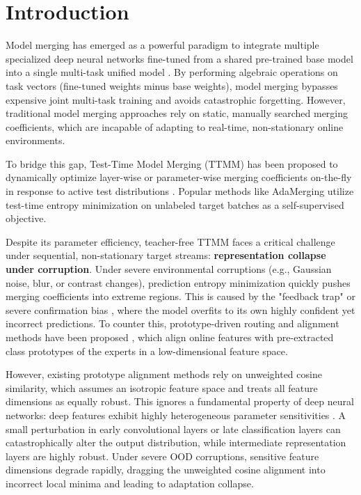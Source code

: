 \documentclass{article}
\theoremstyle{plain}
\theoremstyle{definition}
\theoremstyle{remark}
\begin{document}
\section{Introduction}
\label{submission-intro}
Model merging has emerged as a powerful paradigm to integrate multiple specialized deep neural networks fine-tuned from a shared pre-trained base model into a single multi-task unified model \citep{ilharco2022editing, yadav2023ties}. By performing algebraic operations on task vectors (fine-tuned weights minus base weights), model merging bypasses expensive joint multi-task training and avoids catastrophic forgetting. However, traditional model merging approaches rely on static, manually searched merging coefficients, which are incapable of adapting to real-time, non-stationary online environments.

To bridge this gap, Test-Time Model Merging (TTMM) has been proposed to dynamically optimize layer-wise or parameter-wise merging coefficients on-the-fly in response to active test distributions \citep{yang2024adamerging}. Popular methods like AdaMerging \citep{yang2024adamerging} utilize test-time entropy minimization on unlabeled target batches as a self-supervised objective. 

Despite its parameter efficiency, teacher-free TTMM faces a critical challenge under sequential, non-stationary target streams: \textbf{representation collapse under corruption}. Under severe environmental corruptions (e.g., Gaussian noise, blur, or contrast changes), prediction entropy minimization quickly pushes merging coefficients into extreme regions. This is caused by the "feedback trap" or severe confirmation bias \citep{wang2022cotta}, where the model overfits to its own highly confident yet incorrect predictions. To counter this, prototype-driven routing and alignment methods have been proposed \citep{sub2_anon, sub8_anon}, which align online features with pre-extracted class prototypes of the experts in a low-dimensional feature space.

However, existing prototype alignment methods rely on unweighted cosine similarity, which assumes an isotropic feature space and treats all feature dimensions as equally robust. This ignores a fundamental property of deep neural networks: deep features exhibit highly heterogeneous parameter sensitivities \citep{sub7_anon}. A small perturbation in early convolutional layers or late classification layers can catastrophically alter the output distribution, while intermediate representation layers are highly robust. Under severe OOD corruptions, sensitive feature dimensions degrade rapidly, dragging the unweighted cosine alignment into incorrect local minima and leading to adaptation collapse.
\end{document}
